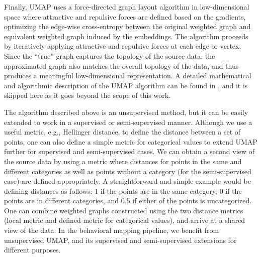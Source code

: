 Finally, UMAP uses a force-directed graph layout algorithm in low-dimensional space where attractive and repulsive forces are defined based on the gradients, optimizing the edge-wise cross-entropy between the original weighted graph and equivalent weighted graph induced by the embeddings.
The algorithm proceeds by iteratively applying attractive and repulsive forces at each edge or vertex.
Since the ``true'' graph captures the topology of the source data, the approximated graph also matches the overall topology of the data, and thus produces a meaningful low-dimensional representation.
A detailed mathematical and algorithmic description of the UMAP algorithm can be found in \citep{mcinnes_umap_2020}, and it is skipped here as it goes beyond the scope of this work.

The algorithm described above is an unsupervised method, but it can be easily extended to work in a supervised or semi-supervised manner.
Although we use a useful metric, e.g., Hellinger distance, to define the distance between a set of points, one can also define a simple metric for categorical values to extend UMAP further for supervised and semi-supervised cases.
We can obtain a second view of the source data by using a metric where distances for points in the same  and different categories as well as points without a category (for the semi-supervised case) are defined appropriately.
A straightforward and simple example would be defining distances as follows: 1 if the points are in the same category, 0 if the points are in different categories, and 0.5 if either of the points is uncategorized.
One can combine weighted graphs constructed using the two distance metrics (local metric and defined metric for categorical values), and arrive at a shared view of the data.
In the behavioral mapping pipeline, we benefit from unsupervised UMAP, and its supervised and semi-supervised extensions for different purposes.

